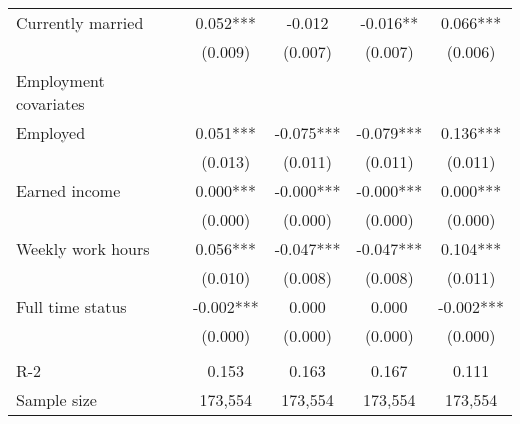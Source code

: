 \begin{tabular}{lcccc}
 Currently married   & 0.052***   & -0.012   & -0.016**   & 0.066***  \\
 & (0.009)   & (0.007)   & (0.007)   & (0.006)  \\
 Employment covariates  \\
 Employed   & 0.051***   & -0.075***   & -0.079***   & 0.136***  \\
 & (0.013)   & (0.011)   & (0.011)   & (0.011)  \\
 Earned income   & 0.000***   & -0.000***   & -0.000***   & 0.000***  \\
 & (0.000)   & (0.000)   & (0.000)   & (0.000)  \\
 Weekly work hours   & 0.056***   & -0.047***   & -0.047***   & 0.104***  \\
 & (0.010)   & (0.008)   & (0.008)   & (0.011)  \\
 Full time status   & -0.002***   & 0.000   & 0.000   & -0.002***  \\
 & (0.000)   & (0.000)   & (0.000)   & (0.000)  \\
\\
R-2 & 0.153 & 0.163 & 0.167 & 0.111 \\
Sample size & 173,554 & 173,554 & 173,554 & 173,554 \\
\bottomrule
\bottomrule
\end{tabular}